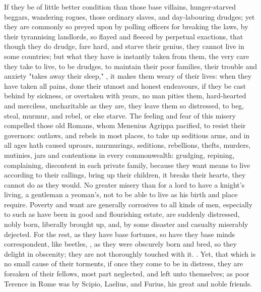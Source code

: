 If they be of little better condition than those base villains, hunger-starved
beggars, wandering rogues, those ordinary slaves, and day-labouring drudges;
yet they are commonly so preyed upon by polling officers
for breaking the laws, by their tyrannising landlords, so flayed and fleeced by
perpetual exactions, that though they do drudge, fare
hard, and starve their genius, they cannot live in some
countries; but what they have is instantly taken from them, the very care they
take to live, to be drudges, to maintain their poor families, their trouble and
anxiety "takes away their sleep," , it makes them
weary of their lives: when they have taken all pains, done their utmost and
honest endeavours, if they be cast behind by sickness, or overtaken with years,
no man pities them, hard-hearted and merciless, uncharitable as they are, they
leave them so distressed, to beg, steal, murmur, and
rebel, or else starve. The feeling and fear of this misery
compelled those old Romans, whom Menenius Agrippa pacified, to resist their
governors: outlaws, and rebels in most places, to take up seditious arms, and
in all ages hath caused uproars, murmurings, seditions, rebellions, thefts,
murders, mutinies, jars and contentions in every commonwealth: grudging,
repining, complaining, discontent in each private family, because they want
means to live according to their callings, bring up their children, it breaks
their hearts, they cannot do as they would. No greater misery than for a lord
to have a knight's living, a gentleman a yeoman's, not to be able to live as
his birth and place require. Poverty and want are generally corrosives to all
kinds of men, especially to such as have been in good and flourishing estate,
are suddenly distressed, nobly born, liberally brought up,
and, by some disaster and casualty miserably dejected. For the rest, as they
have base fortunes, so have they base minds correspondent, like beetles, , as they were obscurely
born and bred, so they delight in obscenity; they are not thoroughly touched
with it. .
Yet, that which is no small cause of their torments, if once they come to be in
distress, they are forsaken of their fellows, most part neglected, and left
unto themselves; as poor Terence in Rome was by Scipio,
Laelius, and Furius, his great and noble friends.

